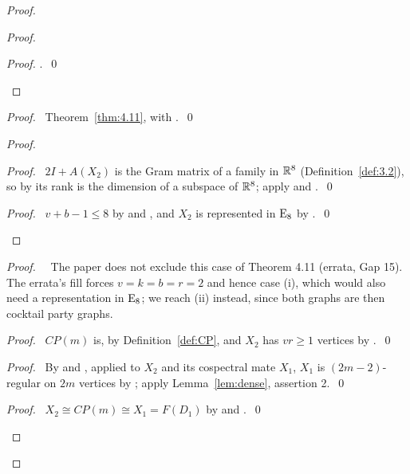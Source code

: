 \begin{proof}
\begin{proof}
\begin{proof}
   .~\qed\end{proof}
 \end{proof}
 \begin{proof}\pf\ Theorem~\ref{thm:4.11}, with
  .~\qed\end{proof}
 \begin{proof}
  \begin{proof}\pf\ $2I+A(X_2)$ is the Gram matrix of a family in ${\mathbb R}^8$
   (Definition~\ref{def:3.2}), so by  its rank is the dimension of a subspace of
   ${\mathbb R}^8$; apply  and .~\qed\end{proof}
  \qedstep
  \begin{proof}\pf\ $v+b-1\le8$ by  and , and $X_2$ is
   represented in $\mathrm{E}_8$ by .~\qed\end{proof}
 \end{proof}
 \begin{proof}
  \pfsketch\ \repair\ The paper does not exclude this case of Theorem 4.11 (errata, Gap 15). The
  errata's fill forces $v=k=b=r=2$ and hence case (i), which would also need a representation in
  $\mathrm{E}_8$; we reach (ii) instead, since both graphs are then cocktail party graphs.
  \begin{proof}\pf\ $CP(m)$ is, by Definition~\ref{def:CP}, and
   $X_2$ has $vr\ge1$ vertices by .~\qed\end{proof}
  \begin{proof}\pf\ By  and , applied to $X_2$ and its
   cospectral mate $X_1$, $X_1$ is $(2m-2)$-regular on $2m$ vertices by ; apply
   Lemma~\ref{lem:dense}, assertion 2.~\qed\end{proof}
  \qedstep
  \begin{proof}\pf\ $X_2\cong CP(m)\cong X_1=F(D_1)$ by  and
   .~\qed\end{proof}
 \end{proof}

\end{proof}
